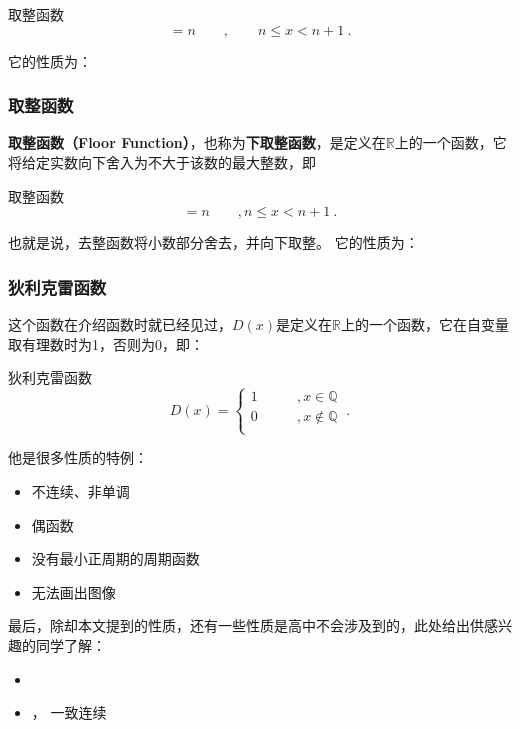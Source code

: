 \begin{definition}{取整函数}
\begin{equation}
[x] = n\qquad,\qquad n \leq x<n+1~.
\end{equation}
\end{definition}

它的性质为：

\subsubsection{取整函数}

\textbf{取整函数（Floor Function）}，也称为\textbf{下取整函数}，是定义在$\mathbb{R}$上的一个函数，它将给定实数向下舍入为不大于该数的最大整数，即


\begin{definition}{取整函数}
\begin{equation}
[x] = n\qquad,n \leq x<n+1~.
\end{equation}
\end{definition}


也就是说，去整函数将小数部分舍去，并向下取整。
它的性质为：

\subsubsection{狄利克雷函数}

这个函数在介绍函数时就已经见过，$D(x)$是定义在$\mathbb{R}$上的一个函数，它在自变量取有理数时为1，否则为0，即：
\begin{definition}{狄利克雷函数}
\begin{equation}
D(x)=\begin{cases}
1\qquad&, x\in\mathbb{Q} \\
0\qquad&, x\notin\mathbb{Q}  \\
\end{cases} ~.
\end{equation}
\end{definition}

他是很多性质的特例：
\begin{itemize}
\item 不连续、非单调
\item 偶函数
\item 没有最小正周期的周期函数
\item 无法画出图像
\end{itemize}

最后，除却本文提到的性质，还有一些性质是高中不会涉及到的，此处给出供感兴趣的同学了解：
\begin{itemize}
\item {}
\item {}， 一致连续
\end{itemize}